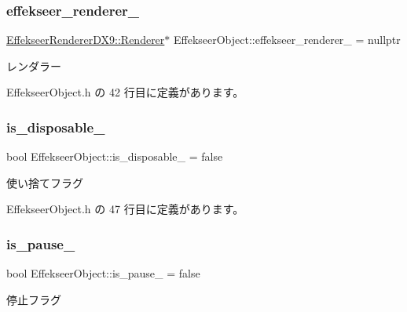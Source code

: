 \subsubsection{\texorpdfstring{effekseer\+\_\+renderer\+\_\+}{effekseer\_renderer\_}}
{\footnotesize\ttfamily \mbox{\hyperlink{class_effekseer_renderer_d_x9_1_1_renderer}{Effekseer\+Renderer\+D\+X9\+::\+Renderer}}$\ast$ Effekseer\+Object\+::effekseer\+\_\+renderer\+\_\+ = nullptr\hspace{0.3cm}{\ttfamily [private]}}



レンダラー 



 Effekseer\+Object.\+h の 42 行目に定義があります。

\mbox{\label{class_effekseer_object_ae48424a2f453590f97ce1b412882943f}} 
\subsubsection{\texorpdfstring{is\+\_\+disposable\+\_\+}{is\_disposable\_}}
{\footnotesize\ttfamily bool Effekseer\+Object\+::is\+\_\+disposable\+\_\+ = false\hspace{0.3cm}{\ttfamily [private]}}



使い捨てフラグ 



 Effekseer\+Object.\+h の 47 行目に定義があります。

\mbox{\label{class_effekseer_object_ad34fd902c49b1f68dc7b212fe9d2676d}} 
\subsubsection{\texorpdfstring{is\+\_\+pause\+\_\+}{is\_pause\_}}
{\footnotesize\ttfamily bool Effekseer\+Object\+::is\+\_\+pause\+\_\+ = false\hspace{0.3cm}{\ttfamily [private]}}



停止フラグ 



